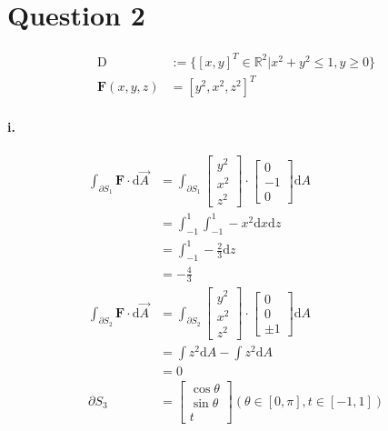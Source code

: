 \documentclass[11pt, a4paper]{article}
\begin{document}
\section*{Question 2}
$$\begin{aligned}
    \mathrm{D} &:= \{[x, y]^T \in \mathbb{R}^2 | x^2+y^2 \leq 1, y \geq 0\} \\
    \bm{F}(x, y, z) &= [y^2, x^2, z^2]^T
\end{aligned}$$

\paragraph{i.}
$$\begin{aligned}
    \int_{\partial S_1} \bm{F} \cdot \mathrm{d}\vec{A} &= \int_{\partial S_1}
    \begin{bmatrix}
        y^2 \\
        x^2 \\
        z^2
    \end{bmatrix} \cdot
    \begin{bmatrix}
        0 \\
        -1 \\
        0
    \end{bmatrix} \mathrm{d}A \\
    &= \int_{-1}^{1} \int_{-1}^{1}-x^2 \mathrm{d}x \mathrm{d}z\\
    &= \int_{-1}^{1} -\frac{2}{3}\mathrm{d}z \\
    &=-\frac{4}{3} \\
    \int_{\partial S_2} \bm{F} \cdot \mathrm{d}\vec{A} &= \int_{\partial S_2}
    \begin{bmatrix}
        y^2 \\
        x^2 \\
        z^2
    \end{bmatrix} \cdot
    \begin{bmatrix}
        0 \\
        0 \\
        \pm 1
    \end{bmatrix} \mathrm{d}A \\
    &= \int z^2 \mathrm{d}A - \int z^2 \mathrm{d}A \\
    &= 0 \\
    \partial S_3 &=
    \begin{bmatrix}
        \cos \theta \\
        \sin \theta \\
        t
    \end{bmatrix} (\theta \in [0, \pi], t \in [-1, 1])\\

\end{aligned}$$
\end{document}
